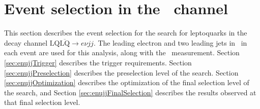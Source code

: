 \section{Event selection in the \enujj~channel}
\label{sec:enujjSelection}


This section describes the event selection for the search
for leptoquarks in the decay channel $\text{LQ}\overline{\text{LQ}}\rightarrow e\nu jj$.
The leading electron and two leading jets in \pt~in each event are used 
for this analysis, along with the \met~measurement.
Section \ref{sec:enujjTrigger} describes the trigger requirements.
Section \ref{sec:enujjPreselection} describes the preselection level of the search.
Section \ref{sec:enujjOptimization} describes the optimization of the final selection level of the search, and
Section \ref{sec:enujjFinalSelection} describes the results observed at that final selection level.

